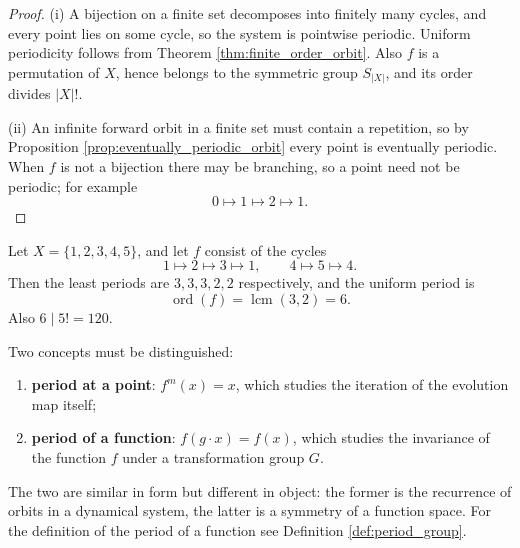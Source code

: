 \begin{proof}
(i) A bijection on a finite set decomposes into finitely many cycles, and every point lies on some cycle, so the system is pointwise periodic. Uniform periodicity follows from Theorem \ref{thm:finite_order_orbit}. Also \(f\) is a permutation of \(X\), hence belongs to the symmetric group \(S_{|X|}\), and its order divides \(|X|!\).

(ii) An infinite forward orbit in a finite set must contain a repetition, so by Proposition \ref{prop:eventually_periodic_orbit} every point is eventually periodic. When \(f\) is not a bijection there may be branching, so a point need not be periodic; for example
\[
0\mapsto 1\mapsto 2\mapsto 1.
\]
\end{proof}

\begin{example}\label{ex:finite_bijection_period}
Let \(X=\{1,2,3,4,5\}\), and let \(f\) consist of the cycles
\[
1\mapsto 2\mapsto 3\mapsto 1,\qquad
4\mapsto 5\mapsto 4.
\]
Then the least periods are \(3,3,3,2,2\) respectively, and the uniform period is
\[
\operatorname{ord}(f)=\operatorname{lcm}(3,2)=6.
\]
Also \(6\mid 5!=120\).
\end{example}

\begin{remark}\label{rem:function_period_vs_point_period}
Two concepts must be distinguished:
\begin{enumerate}[label=(\roman*)]
    \item \textbf{period at a point}: \(f^m(x)=x\), which studies the iteration of the evolution map itself;
    \item \textbf{period of a function}: \(f(g\cdot x)=f(x)\), which studies the invariance of the function \(f\) under a transformation group \(G\).
\end{enumerate}
The two are similar in form but different in object: the former is the recurrence of orbits in a dynamical system, the latter is a symmetry of a function space. For the definition of the period of a function see Definition \ref{def:period_group}.
\end{remark}

